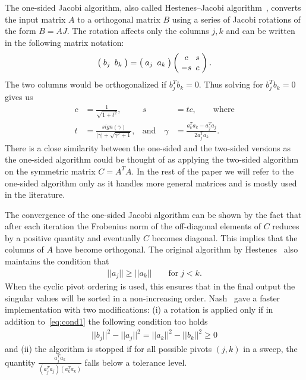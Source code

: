 \documentclass[10pt, conference, compsocconf]{IEEEtran}
\begin{document}
The one-sided Jacobi algorithm, also called Hestenes–Jacobi algorithm~\cite{hestenes1958inversion}, converts the input matrix $A$ to a orthogonal matrix $B$ using a series of Jacobi rotations of the form $B = A J$. The rotation affects only the columns $j,k$ and can be written in the following matrix notation:
\begin{align}
\setlength{\arraycolsep}{2.5pt}
  \left(\begin{array}{cc}
    b_{j} & b_{k} 
  \end{array} \right)
  =
  \left(\begin{array}{cc}
    a_{j} & a_{k} 
  \end{array} \right)
  \left(\begin{array}{cc}
    c & s \\
    -s & c
  \end{array} \right). \nonumber
\end{align}
The two columns would be orthogonalized if $b_j^T b_k = 0$. Thus solving for $b_{j}^T b_{k} = 0$ gives us 
\begin{align}
  c &= \frac{1}{\sqrt{1+t^2}}, & s&=tc, \qquad \text{where} \nonumber \\
  t &= \frac{sign(\gamma)}{|\gamma|+\sqrt{\gamma^2+1}}, & \text{and} \quad \gamma &= \frac{a_k^T a_k - a_j^T a_j}{2a_j^Ta_k}.
  \label{eq:onesided}
\end{align}
There is a close similarity between the one-sided and the two-sided versions as the one-sided algorithm could be thought of as applying the two-sided algorithm on the symmetric matrix $C = A^TA$. In the rest of the paper we will refer to the one-sided algorithm only as it handles more general matrices and is mostly used in the literature.

The convergence of the one-sided Jacobi algorithm can be shown by the fact that after each iteration the Frobenius norm of the off-diagonal elements of $C$ reduces by a positive quantity and eventually $C$ becomes diagonal. This implies that the columns of $A$ have become orthogonal. The original algorithm by Hestenes~\cite{hestenes1958inversion} also maintains the condition that 
\begin{align}
  ||a_j|| \ge ||a_k|| \qquad \text{for} \; j<k. \label{eq:cond1}
\end{align}
When the cyclic pivot ordering is used, this ensures that in the final output the singular values will be sorted in a non-increasing order. Nash~\cite{nash1975one} gave a faster implementation with two modifications: (i) a rotation is applied only if in addition to~\eqref{eq:cond1} the following condition too holds
\begin{align}
  ||b_j||^2 - ||a_j||^2 = ||a_k||^2 - ||b_k||^2 \ge 0 \label{eq:cond2}
\end{align}
and (ii) the algorithm is stopped if for all possible pivots $(j,k)$ in a sweep, the quantity $\frac{a_j^Ta_k}{(a_j^Ta_j)(a_k^Ta_k)}$ falls below a tolerance level.
\end{document}
